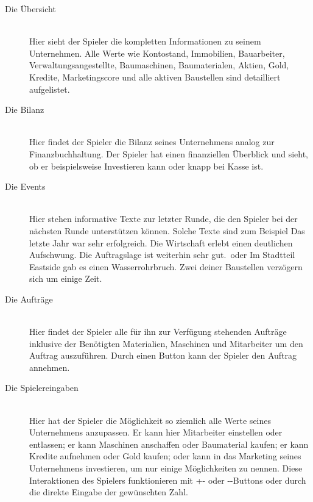 \begin{description}
	\item[Die Übersicht]\hfill \\
	Hier sieht der Spieler die kompletten Informationen zu seinem Unternehmen. Alle Werte wie Kontostand, Immobilien, Bauarbeiter, Verwaltungsangestellte, Baumaschinen, Baumaterialen, Aktien, Gold, Kredite, Marketingscore und alle aktiven Baustellen sind detailliert aufgelistet.
	\item[Die Bilanz]\hfill \\
	Hier findet der Spieler die Bilanz seines Unternehmens analog zur Finanzbuchhaltung. Der Spieler hat einen finanziellen Überblick und sieht, ob er beispielsweise Investieren kann oder knapp bei Kasse ist.
	\item[Die Events]\hfill \\
	Hier stehen informative Texte zur letzter Runde, die den Spieler bei der nächsten Runde unterstützen können. Solche Texte sind zum Beispiel \glqq Das letzte Jahr war sehr erfolgreich. Die Wirtschaft erlebt einen deutlichen Aufschwung. Die Auftragslage ist weiterhin sehr gut.\grqq \ oder \glqq Im Stadtteil Eastside gab es einen Wasserrohrbruch. Zwei deiner Baustellen verzögern sich um einige Zeit.\grqq
	\item[Die Aufträge]\hfill \\
	Hier findet der Spieler alle für ihn zur Verfügung stehenden Aufträge inklusive der Benötigten Materialien, Maschinen und Mitarbeiter um den Auftrag auszuführen. Durch einen Button kann der Spieler den Auftrag annehmen.
	\item[Die Spielereingaben]\hfill \\
	Hier hat der Spieler die Möglichkeit so ziemlich alle Werte seines Unternehmens anzupassen. Er kann hier Mitarbeiter einstellen oder entlassen; er kann Maschinen anschaffen oder Baumaterial kaufen; er kann Kredite aufnehmen oder Gold kaufen; oder kann in das Marketing seines Unternehmens investieren, um nur einige Möglichkeiten zu nennen. Diese Interaktionen des Spielers funktionieren mit \glqq +\grqq- oder \glqq -\grqq-Buttons oder durch die direkte Eingabe der gewünschten Zahl.
\end{description}

